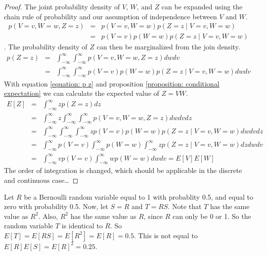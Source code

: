 \documentclass[12pt]{article}
\newcommand{\propref}[1]{\ref{proposition: #1}}
\newcommand{\eqnref}[1]{\ref{equation: #1}}
\begin{document}
\begin{proof}
    The joint probability density of $V$, $W$, and $Z$ can be expanded using the chain rule of probability and our assumption of independence between $V$ and $W$.
    \begin{eqnarray}
        p(V=v, W=w, Z=z) &=& p(V=v, W=w)p(Z=z \mid V=v,W=w) \nonumber \\
            &=& p(V=v)p(W=w)p(Z=z \mid V=v,W=w)
            \label{equation: joint density}
    \end{eqnarray}.
    The probability density of $Z$ can then be marginalized from the join density.
    \begin{eqnarray}
        p(Z=z) &=& \int_{-\infty}^{\infty} \int_{-\infty}^{\infty} p(V=v, W=w, Z=z) dwdv \nonumber \\
        &=& \int_{-\infty}^{\infty} \int_{-\infty}^{\infty} p(V=v)p(W=w)p(Z=z \mid V=v,W=w) dwdv
        \label{equation: p z}
    \end{eqnarray}
    With equation \eqnref{p z} and proposition \propref{conditional expectation} we can calculate the expected value of $Z=VW$.
    \begin{eqnarray}
        E[Z] &=& \int_{-\infty}^{\infty} zp(Z=z)dz \nonumber \\
        &=& \int_{-\infty}^{\infty} z \int_{-\infty}^{\infty} \int_{-\infty}^{\infty} p(V=v,W=w,Z=z) dwdvdz \nonumber \\
        &=& \int_{-\infty}^{\infty} \int_{-\infty}^{\infty} \int_{-\infty}^{\infty} zp(V=v)p(W=w)p(Z=z \mid V=v,W=w) dwdvdz \nonumber \\
        &=& \int_{-\infty}^{\infty} p(V=v) \int_{-\infty}^{\infty} p(W=w) \int_{-\infty}^{\infty} zp(Z=z \mid V=v,W=w) dzdwdv \nonumber \\
        &=& \int_{-\infty}^{\infty} vp(V=v) \int_{-\infty}^{\infty} wp(W=w) dw dv = E[V]E[W]
        \label{equation: z_mean}
    \end{eqnarray}
    The order of integration is changed, which should be applicable in the discrete and continuous case\dots
\end{proof}

Let $R$ be a Bernoulli random variable equal to 1 with probablity 0.5, and equal to zero with probability 0.5.
Now, let $S=R$ and $T=RS$.
Note that $T$ has the same value as $R^2$.
Also, $R^2$ has the same value as $R$, since $R$ can only be 0 or 1.
So the random variable $T$ is identical to $R$.
So $E[T]=E[RS]=E[R^2]=E[R]=0.5$. This is not equal to $E[R]E[S]=E[R]^2=0.25$.




%
%

\end{document}
